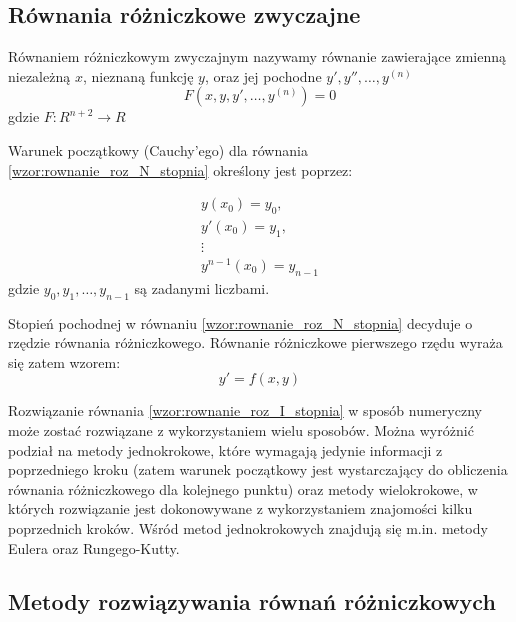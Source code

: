 \subsection{Równania różniczkowe zwyczajne}

Równaniem różniczkowym zwyczajnym nazywamy równanie zawierające zmienną niezależną $x$, nieznaną funkcję $y$, oraz jej pochodne $y', y'', \hdots, y^{(n)}$ \cite[str. 7]{BCh_2001}
\begin{equation}
	\label{wzor:rownanie_roz_N_stopnia}
	F(x,y,y',\hdots,y^{(n)}) = 0
\end{equation}
gdzie $F:R^{n+2} \rightarrow R$

Warunek początkowy (Cauchy'ego) dla równania \ref{wzor:rownanie_roz_N_stopnia} określony jest poprzez: 

\begin{equation}
\begin{array}{c}
y(x_0)       =  y_0,     \\
y'(x_0)      =  y_1,     \\
\vdots			   	     \\
y^{n-1}(x_0) = y_{n-1}
\end{array}
\end{equation}
gdzie $y_0, y_1, \hdots, y_{n-1}$ są zadanymi liczbami.

Stopień pochodnej w równaniu \ref{wzor:rownanie_roz_N_stopnia} decyduje o rzędzie równania różniczkowego. Równanie różniczkowe pierwszego rzędu wyraża się zatem wzorem:
\begin{equation}
	\label{wzor:rownanie_roz_I_stopnia}
	y' = f(x,y)
\end{equation}

Rozwiązanie równania \ref{wzor:rownanie_roz_I_stopnia} w sposób numeryczny może zostać rozwiązane z wykorzystaniem wielu sposobów. Można wyróżnić podział na metody jednokrokowe, które wymagają jedynie informacji z poprzedniego kroku (zatem warunek początkowy jest wystarczający do obliczenia równania różniczkowego dla kolejnego punktu) oraz metody wielokrokowe, w których rozwiązanie jest dokonowywane z wykorzystaniem znajomości kilku poprzednich kroków. Wśród metod jednokrokowych znajdują się m.in. metody Eulera oraz Rungego-Kutty.

\subsection{Metody rozwiązywania równań różniczkowych}

